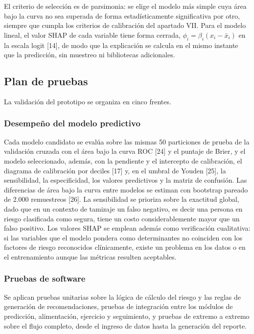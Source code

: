 \documentclass[conference]{IEEEtran}
\begin{document}
El criterio de selección es de parsimonia: se elige el modelo más simple cuya área bajo la curva no sea superada de forma estadísticamente significativa por otro, siempre que cumpla los criterios de calibración del apartado VII. Para el modelo lineal, el valor SHAP de cada variable tiene forma cerrada, $\phi_i = \beta_i (x_i - \bar{x}_i)$ en la escala logit [14], de modo que la explicación se calcula en el mismo instante que la predicción, sin muestreo ni bibliotecas adicionales.

\subsection{Plan de pruebas}
La validación del prototipo se organiza en cinco frentes.

\subsubsection{Desempeño del modelo predictivo}
Cada modelo candidato se evalúa sobre las mismas 50 particiones de prueba de la validación cruzada con el área bajo la curva ROC [24] y el puntaje de Brier, y el modelo seleccionado, además, con la pendiente y el intercepto de calibración, el diagrama de calibración por deciles [17] y, en el umbral de Youden [25], la sensibilidad, la especificidad, los valores predictivos y la matriz de confusión. Las diferencias de área bajo la curva entre modelos se estiman con bootstrap pareado de 2.000 remuestreos [26]. La sensibilidad se prioriza sobre la exactitud global, dado que en un contexto de tamizaje un falso negativo, es decir una persona en riesgo clasificada como segura, tiene un costo considerablemente mayor que un falso positivo. Los valores SHAP se emplean además como verificación cualitativa: si las variables que el modelo pondera como determinantes no coinciden con los factores de riesgo reconocidos clínicamente, existe un problema en los datos o en el entrenamiento aunque las métricas resulten aceptables.

\subsubsection{Pruebas de software}
Se aplican pruebas unitarias sobre la lógica de cálculo del riesgo y las reglas de generación de recomendaciones, pruebas de integración entre los módulos de predicción, alimentación, ejercicio y seguimiento, y pruebas de extremo a extremo sobre el flujo completo, desde el ingreso de datos hasta la generación del reporte.
\end{document}
